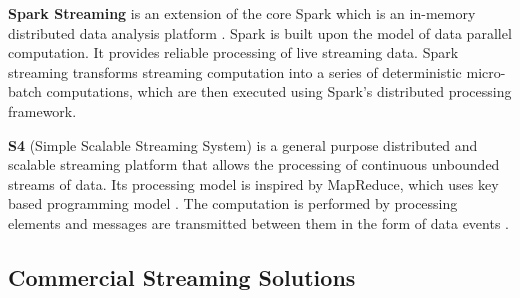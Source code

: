 \documentclass{acm_proc_article-sp}
\begin{document}
\textbf{Spark Streaming} is an extension of the core Spark which is an in-memory distributed data analysis platform \cite{SparkStreaming:Online}. Spark is built upon the model of data parallel computation. It provides reliable processing of live streaming data. Spark streaming transforms streaming computation into a series of deterministic micro-batch computations, which are then executed using Spark's distributed processing framework.
 
\textbf{S4} (Simple Scalable Streaming System) is a general purpose distributed and scalable streaming platform that allows the processing of continuous unbounded streams of data. Its processing model is inspired by MapReduce, which uses key based programming model \cite{gdfm:S4vsStorm:Online}. The computation is performed by processing elements and messages are transmitted between them in the form of data events \cite{Neumeyer:2010:SDS:1933306.1934385}.


\subsection{Commercial Streaming Solutions}
\end{document}
